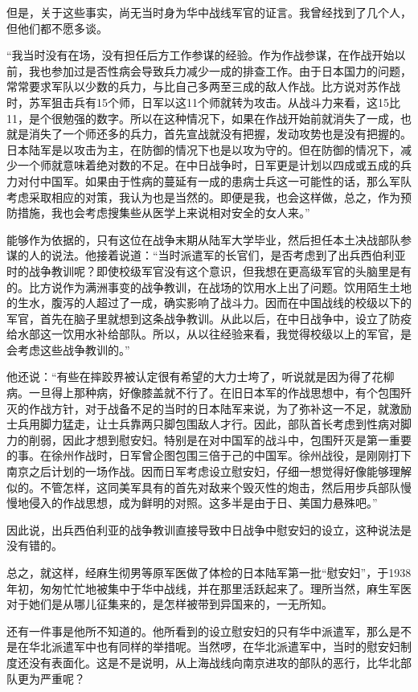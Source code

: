 \documentclass[12pt,UTF8]{ctexbook}
\begin{document}
但是，关于这些事实，尚无当时身为华中战线军官的证言。我曾经找到了几个人，但他们都不愿多谈。

“我当时没有在场，没有担任后方工作参谋的经验。作为作战参谋，在作战开始以前，我也参加过是否性病会导致兵力减少一成的排查工作。由于日本国力的问题，常常要求军队以少数的兵力，与比自己多两至三成的敌人作战。比方说对苏作战时，苏军狙击兵有15个师，日军以这11个师就转为攻击。从战斗力来看，这15比11，是个很勉强的数字。所以在这种情况下，如果在作战开始前就消失了一成，也就是消失了一个师还多的兵力，首先宣战就没有把握，发动攻势也是没有把握的。日本陆军是以攻击为主，在防御的情况下也是以攻为守的。但在防御的情况下，减少一个师就意味着绝对数的不足。在中日战争时，日军更是计划以四成或五成的兵力对付中国军。如果由于性病的蔓延有一成的患病士兵这一可能性的话，那么军队考虑采取相应的对策，我认为也是当然的。即便是我，也会这样做，总之，作为预防措施，我也会考虑搜集些从医学上来说相对安全的女人来。”

能够作为依据的，只有这位在战争末期从陆军大学毕业，然后担任本土决战部队参谋的人的说法。他接着说道：“当时派遣军的长官们，是否考虑到了出兵西伯利亚时的战争教训呢？即使校级军官没有这个意识，但我想在更高级军官的头脑里是有的。比方说作为满洲事变的战争教训，在战场的饮用水上出了问题。饮用陌生土地的生水，腹泻的人超过了一成，确实影响了战斗力。因而在中国战线的校级以下的军官，首先在脑子里就想到这条战争教训。从此以后，在中日战争中，设立了防疫给水部这一饮用水补给部队。所以，从以往经验来看，我觉得校级以上的军官，是会考虑这些战争教训的。”

他还说：“有些在摔跤界被认定很有希望的大力士垮了，听说就是因为得了花柳病。一旦得上那种病，好像膝盖就不行了。在旧日本军的作战思想中，有个包围歼灭的作战方针，对于战备不足的当时的日本陆军来说，为了弥补这一不足，就激励士兵用脚力猛走，让士兵靠两只脚包围敌人才行。因此，部队首长考虑到性病对脚力的削弱，因此才想到慰安妇。特别是在对中国军的战斗中，包围歼灭是第一重要的事。在徐州作战时，日军曾企图包围三倍于己的中国军。徐州战役，是刚刚打下南京之后计划的一场作战。因而日军考虑设立慰安妇，仔细一想觉得好像能够理解似的。不管怎样，这同美军具有的首先对敌来个毁灭性的炮击，然后用步兵部队慢慢地侵入的作战思想，成为鲜明的对照。这多半是由于日、美国力悬殊吧。”

因此说，出兵西伯利亚的战争教训直接导致中日战争中慰安妇的设立，这种说法是没有错的。

总之，就这样，经麻生彻男等原军医做了体检的日本陆军第一批“慰安妇”，于1938年初，匆匆忙忙地被集中于华中战线，并在那里活跃起来了。理所当然，麻生军医对于她们是从哪儿征集来的，是怎样被带到异国来的，一无所知。

还有一件事是他所不知道的。他所看到的设立慰安妇的只有华中派遣军，那么是不是在华北派遣军中也有同样的举措呢。当然啰，在华北派遣军中，当时的慰安妇制度还没有表面化。这是不是说明，从上海战线向南京进攻的部队的恶行，比华北部队更为严重呢？
\end{document}
